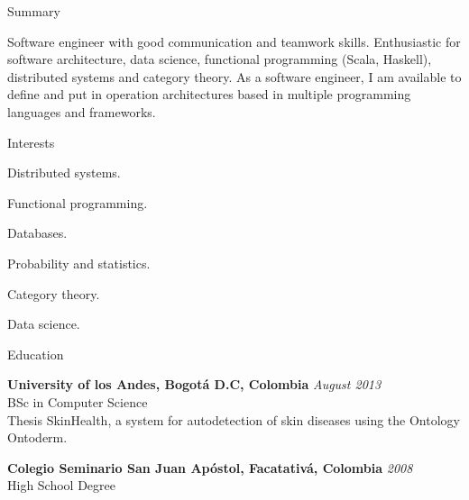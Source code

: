 \documentclass[spanish]{resume}
\begin{document}

\begin{rSection}{Summary}

Software engineer with good communication and teamwork skills. Enthusiastic for software architecture, data science, functional programming (Scala, Haskell), distributed systems and category theory. As a software engineer, I am available to define and put in operation architectures based in multiple programming languages and frameworks. 

\end{rSection}

\begin{rSection}{Interests}

\item Distributed systems.
\item Functional programming.
\item Databases.
\item Probability and statistics.
\item Category theory.
\item Data science.


\end{rSection}


\begin{rSection}{Education}

{\bf University of los Andes, Bogot\'a D.C, Colombia} \hfill {\em August 2013} \\
BSc in Computer Science \\
Thesis SkinHealth, a system for autodetection of skin diseases using the Ontology Ontoderm.

{\bf Colegio Seminario San Juan Ap\'ostol, Facatativ\'a, Colombia} \hfill {\em 2008} \\
 High School Degree

\end{rSection}
\end{document}
